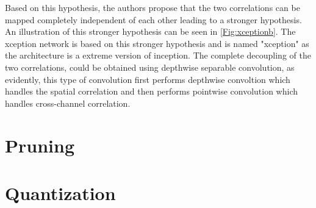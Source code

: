 Based on this hypothesis, the authors propose that the two correlations can be mapped completely independent of each other leading to a stronger hypothesis. An illustration of this stronger hypothesis can be seen in \ref{Fig:xceptionb}. The xception network is based on this stronger hypothesis and is named "xception" as the architecture is a extreme version of inception. The complete decoupling of the two correlations, could be obtained using depthwise separable convolution, as evidently, this type of convolution first performs depthwise convoltion which handles the spatial correlation and then performs pointwise convolution which handles cross-channel correlation.

\section{Pruning}

\section{Quantization}

